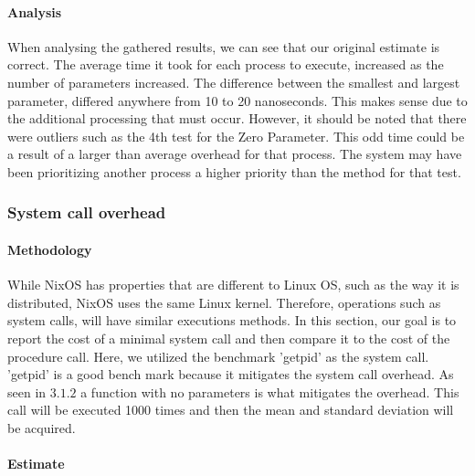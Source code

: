 \paragraph{Analysis}

When analysing the gathered results, we can see that our original estimate is correct. The average time it took for each process to execute, increased as the number of parameters increased. The difference between the smallest and largest parameter, differed anywhere from 10 to 20 nanoseconds. This makes sense due to the additional processing that must occur. However, it should be noted that there were outliers such as the 4th test for the Zero Parameter. This odd time could be a result of a larger than average overhead for that process. The system may have been prioritizing another process a higher priority than the method for that test.

\subsubsection{System call overhead}


\paragraph{Methodology}

While NixOS has properties that are different to Linux OS, such as the way it is distributed, NixOS uses the same Linux kernel. Therefore, operations such as system calls, will have similar executions methods. In this section, our goal is to report the cost of a minimal system call and then compare it to the cost of the procedure call. Here, we utilized the benchmark 'getpid' as the system call. 'getpid' is a good bench mark because it mitigates the system call overhead. As seen in $3.1.2$ a function with no parameters is what mitigates the overhead. This call will be executed 1000 times and then the mean and standard deviation will be acquired.

\paragraph{Estimate}

